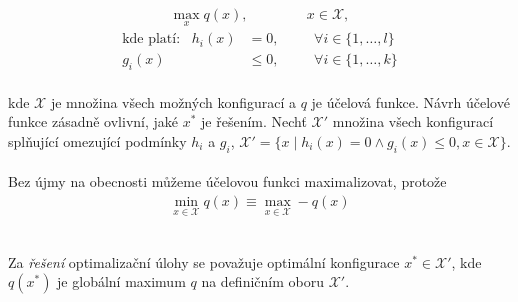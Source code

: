 \begin{definice}
  \begin{align*}
    \max_{x} q(x), \hspace{50pt} x \in \mathcal{X},
  \end{align*}
  \begin{align*}
    \text{kde platí:} \hspace{10pt} h_i(x) &= 0, \hspace{20pt} &\forall i \in \{ 1, \dots, l \} \\
                     g_i(x) &\leq 0, \hspace{20pt} &\forall i \in \{ 1, \dots, k \}
  \end{align*}
  \\
  kde $\mathcal{X}$ je množina všech možných konfigurací a $q$ je účelová funkce.
  Návrh účelové funkce zásadně ovlivní, jaké $x^*$ je řešením.
  Nechť $\mathcal{X}'$ množina všech konfigurací splňující omezující podmínky $h_i$ a $g_i$,
  $\mathcal{X}' = \{ x \mid h_i(x) = 0 \land g_i(x) \leq 0, x \in \mathcal{X} \}$.
  \\
  \\
  Bez újmy na obecnosti můžeme účelovou funkci maximalizovat, protože
  \begin{align*}
    \min_{x \in \mathcal{X}} q(x) \equiv \max_{x \in \mathcal{X}} -q(x)
  \end{align*}
  \\
\end{definice}

\begin{definice}
  Za \textit{řešení} optimalizační úlohy se považuje optimální konfigurace $x^* \in \mathcal{X}'$,
  kde $q(x^*)$ je globální maximum $q$ na definičním oboru $\mathcal{X}'$.
  \\
\end{definice}

